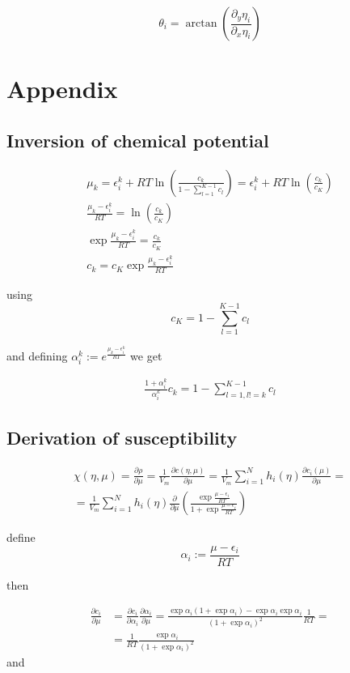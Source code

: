 \documentclass[11pt]{article}
\begin{document}
$$
\theta_i = \arctan{\left(\frac{\partial_y \eta_i}{\partial_x \eta_i}\right)}
$$

\section{Appendix}
\label{sec:org536ee52}

\subsection{Inversion of chemical potential}
\label{sec:org8e0814f}

\begin{align*}
\mu_k = \epsilon_i^k + R T \ln{\left(\frac{c_k}{1-\sum_{l=1}^{K-1} c_l}\right)} = \epsilon_i^k + R T \ln{\left(\frac{c_k}{c_K}\right)} \\
\frac{\mu_k - \epsilon_i^k}{R T} = \ln{\left(\frac{c_k}{c_K}\right)} \\
\exp{\frac{\mu_k - \epsilon_i^k}{R T}} = \frac{c_k}{c_K} \\
c_k = c_K \exp{\frac{\mu_k - \epsilon_i^k}{R T}}
\end{align*}

using 
$$
c_K = 1 - \sum_{l=1}^{K-1} c_l
$$

and defining \(\alpha_i^k := e^{\frac{\mu_k - \epsilon_i^k}{R T}}\) we get

\begin{align*}
\frac{1+\alpha_i^k}{\alpha_i^k} c_k = 1-\sum_{l=1, l!=k}^{K-1} c_l
\end{align*}


\subsection{Derivation of susceptibility}
\label{sec:org9947c31}

\begin{align*}
\chi(\eta, \mu) = \frac{\partial \rho}{\partial \mu} = \frac{1}{V_m} \frac{\partial c(\eta, \mu)}{\partial \mu} = \frac{1}{V_m} \sum_{i=1}^N h_i(\eta) \frac{\partial c_i(\mu)}{\partial \mu} = \\
 = \frac{1}{V_m} \sum_{i=1}^N h_i(\eta) \frac{\partial}{\partial \mu}\left( \frac{\exp{\frac{\mu - \epsilon_i}{R T}}}{1 + \exp{\frac{\mu - \epsilon_i}{R T}}} \right)
\end{align*}

define
$$
\alpha_i := \frac{\mu - \epsilon_i}{R T}
$$

then

\begin{align*}
\frac{\partial c_i}{\partial \mu} &= \frac{\partial c_i}{\partial \alpha_i} \frac{\partial \alpha_i}{\partial \mu} = \frac{\exp{\alpha_i} (1+\exp{\alpha_i}) - \exp{\alpha_i} \exp{\alpha_i}}{(1+\exp{\alpha_i})^2} \frac{1}{R T} = \\
&= \frac{1}{R T} \frac{\exp{\alpha_i}}{(1+\exp{\alpha_i})^2}
\end{align*}
and
\end{document}
